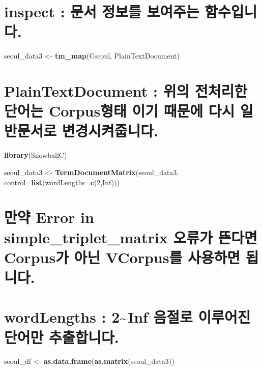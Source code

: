 \documentclass[]{article}
\newenvironment{Shaded}{\begin{snugshade}}{\end{snugshade}}
\newcommand{\KeywordTok}[1]{\textcolor[rgb]{0.13,0.29,0.53}{\textbf{#1}}}
\newcommand{\DataTypeTok}[1]{\textcolor[rgb]{0.13,0.29,0.53}{#1}}
\newcommand{\DecValTok}[1]{\textcolor[rgb]{0.00,0.00,0.81}{#1}}
\newcommand{\StringTok}[1]{\textcolor[rgb]{0.31,0.60,0.02}{#1}}
\newcommand{\OtherTok}[1]{\textcolor[rgb]{0.56,0.35,0.01}{#1}}
\newcommand{\NormalTok}[1]{#1}
\begin{document}
\section{inspect : 문서 정보를 보여주는 함수입니다.}\label{inspect----.}

\begin{Shaded}
\begin{Highlighting}[]
\NormalTok{seoul_data3 <-}\StringTok{ }\KeywordTok{tm_map}\NormalTok{(Cseoul, PlainTextDocument)}
\end{Highlighting}
\end{Shaded}

\section{PlainTextDocument : 위의 전처리한 단어는 Corpus형태 이기 때문에
다시 일반문서로
변경시켜줍니다.}\label{plaintextdocument----corpus-----.}

\begin{Shaded}
\begin{Highlighting}[]
\KeywordTok{library}\NormalTok{(SnowballC)}
\end{Highlighting}
\end{Shaded}

\begin{Shaded}
\begin{Highlighting}[]
\NormalTok{seoul_data3 <-}\StringTok{ }\KeywordTok{TermDocumentMatrix}\NormalTok{(seoul_data3, }\DataTypeTok{control=}\KeywordTok{list}\NormalTok{(}\DataTypeTok{wordLengths=}\KeywordTok{c}\NormalTok{(}\DecValTok{2}\NormalTok{,}\OtherTok{Inf}\NormalTok{)))}
\end{Highlighting}
\end{Shaded}

\section{만약 Error in simple\_triplet\_matrix 오류가 뜬다면 Corpus가
아닌 VCorpus를 사용하면
됩니다.}\label{-error-in-simple_triplet_matrix---corpus--vcorpus--.}

\section{wordLengths : 2\textasciitilde{}Inf 음절로 이루어진 단어만
추출합니다.}\label{wordlengths-2inf----.}

\begin{Shaded}
\begin{Highlighting}[]
\NormalTok{seoul_df <-}\StringTok{ }\KeywordTok{as.data.frame}\NormalTok{(}\KeywordTok{as.matrix}\NormalTok{(seoul_data3))}
\end{Highlighting}
\end{Shaded}
\end{document}
